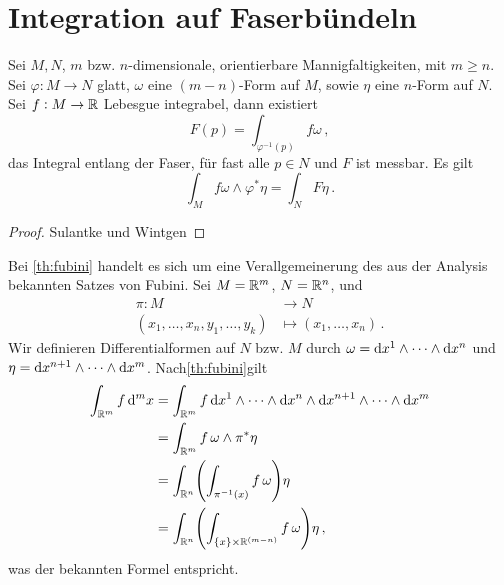 \section[Integration inv Fkt]{Integration auf Faserbündeln}
\begin{theorem}
Sei $M,N$, $m$ bzw. $n$-dimensionale, orientierbare Mannigfaltigkeiten, mit
$m\geq n$.
Sei $\varphi:M\to N$ glatt, $\omega$ eine $(m-n)$-Form auf $M$, sowie $\eta$
eine $n$-Form auf $N$. Sei $f:M\to \mathbb{R}$ Lebesgue integrabel, dann existiert
\begin{equation}
F(p)=\int_{\varphi^{-1}(p)}f\omega\,,
\end{equation}
das Integral entlang der Faser, für fast alle $p\in N$ und $F$ ist messbar. Es
gilt
\begin{equation}
\int_{M}f\omega\wedge\varphi^*\eta=\int_{N}F \eta\,.
\end{equation}
\end{theorem}
\begin{proof}
Sulantke und Wintgen
\end{proof}
\begin{bemerkung}
Bei \autoref{th:fubini} handelt es sich um eine Verallgemeinerung des aus der
Analysis bekannten Satzes von Fubini. 
Sei $M=\mathbb{R}^m$, $N=\mathbb{R}^n$, und 
\begin{align*}
  \pi :M &\to N\\
  (x_1,\dots,x_n,y_1,\dots,y_k) &\mapsto (x_1,\dots,x_n)\,.
\end{align*}
Wir definieren Differentialformen auf $N$ bzw. $M$ durch 
$\omega=\dif{x}^1\wedge\cdots\wedge\dif{x}^n$ und
$\eta=\dif{x}^{n+1}\wedge\cdots\wedge\dif{x}^m$.
Nach\autoref{th:fubini}gilt
\begin{equation}
\begin{split}
\int_{\Reals^m} f\dif{}^m x &= \int_{\Reals^m}
f\dif{x}^1\wedge\cdots\wedge\dif{x}^n\wedge\dif{x}^{n+1}\wedge\cdots\wedge\dif{x}^m\\
&= \int_{\Reals^m}f\,\omega\wedge\pi^*\eta\\
&= \int_{\Reals^n}\left(\int_{\pi^{-1}(x)}f\,\omega\right)\eta\\
&= \int_{\Reals^n}\left(\int_{\{x\}\times\Reals^{(m-n)}}f\,\omega\right)\eta\,,
\end{split}
\end{equation}
was der bekannten Formel entspricht.
\end{bemerkung}
